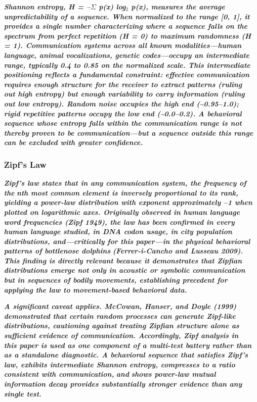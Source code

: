 \documentclass[11pt,letterpaper]{article}
\begin{document}
\textbf{\textit{Shannon entropy, H = --$\Sigma$ p(x) log$_2$ p(x), measures the average unpredictability of a sequence. When normalized to the range [0, 1], it provides a single number characterizing where a sequence falls on the spectrum from perfect repetition (H = 0) to maximum randomness (H = 1). Communication systems across all known modalities---human language, animal vocalizations, genetic codes---occupy an intermediate range, typically 0.4 to 0.85 on the normalized scale. This intermediate positioning reflects a fundamental constraint: effective communication requires enough structure for the receiver to extract patterns (ruling out high entropy) but enough variability to carry information (ruling out low entropy). Random noise occupies the high end (\textasciitilde{}0.95--1.0); rigid repetitive patterns occupy the low end (\textasciitilde{}0.0--0.2). A behavioral sequence whose entropy falls within the communication range is not thereby proven to be communication---but a sequence outside this range can be excluded with greater confidence.}}


\subsubsection{Zipf's Law}

\textbf{\textit{Zipf's law states that in any communication system, the frequency of the }}\textbf{\textit{n}}\textbf{\textit{th most common element is inversely proportional to its rank, yielding a power-law distribution with exponent approximately --1 when plotted on logarithmic axes. Originally observed in human language word frequencies (Zipf 1949), the law has been confirmed in every human language studied, in DNA codon usage, in city population distributions, and---critically for this paper---in the }}\textbf{\textit{physical behavioral patterns of bottlenose dolphins}}\textbf{\textit{ (Ferrer-i-Cancho and Lusseau 2009). This finding is directly relevant because it demonstrates that Zipfian distributions emerge not only in acoustic or symbolic communication but in sequences of bodily movements, establishing precedent for applying the law to movement-based behavioral data.}}


\textbf{\textit{A significant caveat applies. McCowan, Hanser, and Doyle (1999) demonstrated that certain random processes can generate Zipf-like distributions, cautioning against treating Zipfian structure alone as sufficient evidence of communication. Accordingly, Zipf analysis in this paper is used as one component of a multi-test battery rather than as a standalone diagnostic. A behavioral sequence that satisfies Zipf's law, exhibits intermediate Shannon entropy, compresses to a ratio consistent with communication, }}\textbf{\textit{and}}\textbf{\textit{ shows power-law mutual information decay provides substantially stronger evidence than any single test.}}
\end{document}
